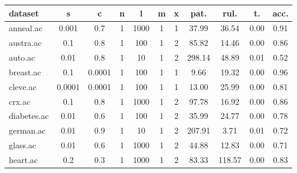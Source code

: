 \begin{table}[htbp]
	\centering
		\begin{tabular}{|l|c|c|c|c|c|c||c|c|c|c|}
		\hline
		\textbf{dataset}	& \textbf{s}	& \textbf{c}	& \textbf{n}	& \textbf{l}	& \textbf{m}	& \textbf{x}	& \textbf{pat.}	& \textbf{rul.}	& \textbf{t.}	& \textbf{acc.}	\\
		\hline
		anneal.ac      & 0.001    & 0.7         & 1              & 1000                & 1             & 1             & 37.99          & 36.54          & 0.00           & 0.91           \\
		\hline
		austra.ac      & 0.1      & 0.8         & 1              & 100                 & 1             & 2             & 85.82          & 14.46          & 0.00           & 0.86           \\
		\hline
		auto.ac        & 0.01     & 0.8         & 1              & 10                  & 1             & 2             & 298.14         & 48.89          & 0.01           & 0.52           \\
		\hline
		breast.ac      & 0.1      & 0.0001      & 1              & 100                 & 1             & 1             & 9.66           & 19.32          & 0.00           & 0.96           \\
		\hline
		cleve.ac       & 0.0001   & 0.0001      & 1              & 100                 & 1             & 1             & 13.00          & 25.99          & 0.00           & 0.81           \\
		\hline
		crx.ac         & 0.1      & 0.8         & 1              & 1000                & 1             & 2             & 97.78          & 16.92          & 0.00           & 0.86           \\
		\hline
		diabetes.ac    & 0.01     & 0.6         & 1              & 100                 & 1             & 2             & 35.99          & 24.77          & 0.00           & 0.78           \\
		\hline
		german.ac      & 0.01     & 0.9         & 1              & 10                  & 1             & 2             & 207.91         & 3.71           & 0.01           & 0.72           \\
		\hline
		glass.ac       & 0.01     & 0.6         & 1              & 1000                & 1             & 2             & 44.88          & 12.83          & 0.00           & 0.71           \\
		\hline
		heart.ac       & 0.2      & 0.3         & 1              & 1000                & 1             & 2             & 83.33          & 118.57         & 0.00           & 0.83           \\

\end{tabular}
\end{table}
